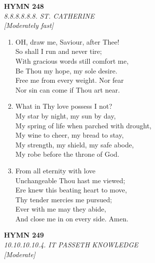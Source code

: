 \newpage
\begin{center}
    {\Large \textbf{HYMN 248}}
    \\
    \textit{8.8.8.8.8.8. ST. CATHERINE}
    \\
    \textit{\small [Moderately fast]}
\end{center}
\vspace{1em}

\begin{enumerate}
    \item OH, draw me, Saviour, after Thee! \\
        So shall I run and never tire; \\
        With gracious words still comfort me, \\
        Be Thou my hope, my sole desire. \\
        Free me from every weight. Nor fear \\
        Nor sin can come if Thou art near.

    \item What in Thy love possess I not? \\
        My star by night, my sun by day, \\
        My spring of life when parched with drought, \\
        My wine to cheer, my bread to stay, \\
        My strength, my shield, my safe abode, \\
        My robe before the throne of God.

    \item From all eternity with love \\
        Unchangeable Thou hast me viewed; \\
        Ere knew this beating heart to move, \\
        Thy tender mercies me pursued; \\
        Ever with me may they abide, \\
        And close me in on every side. Amen.

\end{enumerate}

\newpage
\begin{center}
    {\Large \textbf{HYMN 249}}
    \\
    \textit{10.10.10.10.4. IT PASSETH KNOWLEDGE}
    \\
    \textit{\small [Moderate]}
\end{center}
\vspace{1em}

